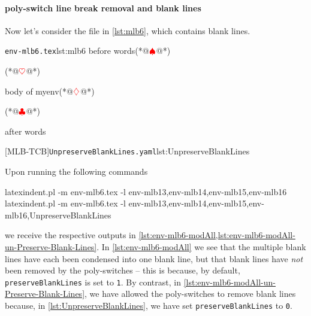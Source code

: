  \paragraph{poly-switch line break removal and blank lines}
  \begin{example}
  Now let's consider the file in \cref{lst:mlb6}, which contains blank lines.

  \begin{cmhtcbraster}
   \begin{cmhlistings}[style=tcblatex,escapeinside={(*@}{@*)}]{\texttt{env-mlb6.tex}}{lst:mlb6}
before words(*@$\color{red}\spadesuit$@*)


\begin{myenv}(*@$\color{red}\heartsuit$@*)


body of myenv(*@$\color{red}\diamondsuit$@*)


\end{myenv}(*@$\color{red}\clubsuit$@*)

after words
\end{cmhlistings}
   [MLB-TCB]{\texttt{UnpreserveBlankLines.yaml}}{lst:UnpreserveBlankLines}
  \end{cmhtcbraster}

  Upon running the following commands 
  \begin{widepage}

   \begin{commandshell}
latexindent.pl -m env-mlb6.tex -l env-mlb13,env-mlb14,env-mlb15,env-mlb16
latexindent.pl -m env-mlb6.tex -l env-mlb13,env-mlb14,env-mlb15,env-mlb16,UnpreserveBlankLines
\end{commandshell}

  \end{widepage}
  we receive the respective outputs in
  \cref{lst:env-mlb6-modAll,lst:env-mlb6-modAll-un-Preserve-Blank-Lines}. In
  \cref{lst:env-mlb6-modAll} we see that the multiple blank lines have each been
  condensed into one blank line, but that blank lines have \emph{not} been removed by the
  poly-switches -- this is because, by default, \texttt{preserveBlankLines} is set to
  \texttt{1}. By contrast, in \cref{lst:env-mlb6-modAll-un-Preserve-Blank-Lines}, we have
  allowed the poly-switches to remove blank lines because, in
  \cref{lst:UnpreserveBlankLines}, we have set \texttt{preserveBlankLines} to \texttt{0}.


\end{example}
